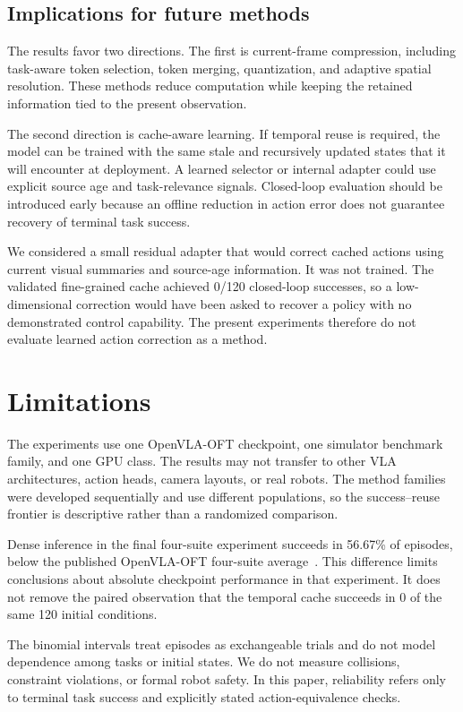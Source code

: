 \documentclass[journal]{IEEEtran}
\begin{document}
\subsection{Implications for future methods}
The results favor two directions. The first is current-frame compression, including task-aware token selection, token merging, quantization, and adaptive spatial resolution. These methods reduce computation while keeping the retained information tied to the present observation.

The second direction is cache-aware learning. If temporal reuse is required, the model can be trained with the same stale and recursively updated states that it will encounter at deployment. A learned selector or internal adapter could use explicit source age and task-relevance signals. Closed-loop evaluation should be introduced early because an offline reduction in action error does not guarantee recovery of terminal task success.

We considered a small residual adapter that would correct cached actions using current visual summaries and source-age information. It was not trained. The validated fine-grained cache achieved 0/120 closed-loop successes, so a low-dimensional correction would have been asked to recover a policy with no demonstrated control capability. The present experiments therefore do not evaluate learned action correction as a method.

\section{Limitations}
The experiments use one OpenVLA-OFT checkpoint, one simulator benchmark family, and one GPU class. The results may not transfer to other VLA architectures, action heads, camera layouts, or real robots. The method families were developed sequentially and use different populations, so the success--reuse frontier is descriptive rather than a randomized comparison.

Dense inference in the final four-suite experiment succeeds in 56.67\% of episodes, below the published OpenVLA-OFT four-suite average~\cite{kim2025oft}. This difference limits conclusions about absolute checkpoint performance in that experiment. It does not remove the paired observation that the temporal cache succeeds in 0 of the same 120 initial conditions.

The binomial intervals treat episodes as exchangeable trials and do not model dependence among tasks or initial states. We do not measure collisions, constraint violations, or formal robot safety. In this paper, reliability refers only to terminal task success and explicitly stated action-equivalence checks.
\end{document}
